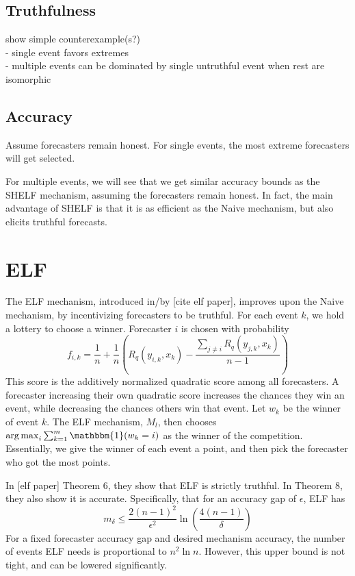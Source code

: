\documentclass[letterpaper,12pt]{article}
\DeclareMathOperator*{\argmax}{arg\,max}
\newcommand{\1}{\mathbbm{1}}
\begin{document}
\subsection{Truthfulness}
show simple counterexample(s?) \\
- single event favors extremes \\
- multiple events can be dominated by single untruthful event when rest are isomorphic \\

\subsection{Accuracy}

Assume forecasters remain honest. For single events, the most extreme forecasters will get selected. 

For multiple events, we will see that we get similar accuracy bounds as the SHELF mechanism, assuming the forecasters remain honest. In fact, the main advantage of SHELF is that it is as efficient as the Naive mechanism, but also elicits truthful forecasts.

\section{ELF}
The ELF mechanism, introduced in/by [cite elf paper], improves upon the Naive mechanism, by incentivizing forecasters to be truthful. For each event $k$, we hold a lottery to choose a winner. Forecaster $i$ is chosen with probability
\[ f_{i, k} = \frac{1}{n} + \frac{1}{n} \left(R_q(y_{i, k}, x_k) - \frac{\sum_{j\neq i} R_q(y_{j, k}, x_k)}{n-1} \right)\]
This score is the additively normalized quadratic score among all forecasters. A forecaster increasing their own quadratic score increases the chances they win an event, while decreasing the chances others win that event. Let $w_k$ be the winner of event $k$. The ELF mechanism, $M_l$, then chooses $\argmax_i \sum_{k=1}^m \1(w_k = i)$ as the winner of the competition. Essentially, we give the winner of each event a point, and then pick the forecaster who got the most points.

In [elf paper] Theorem 6, they show that ELF is strictly truthful. In Theorem 8, they also show it is accurate. Specifically, that for an accuracy gap of $\epsilon$, ELF has
\[ m_\delta \leq \frac{2(n-1)^2}{\epsilon^2} \ln \left(\frac{4(n-1)}{\delta}\right)\]
For a fixed forecaster accuracy gap and desired mechanism accuracy, the number of events ELF needs is proportional to $n^2 \ln n$. However, this upper bound is not tight, and can be lowered significantly. 
\end{document}
